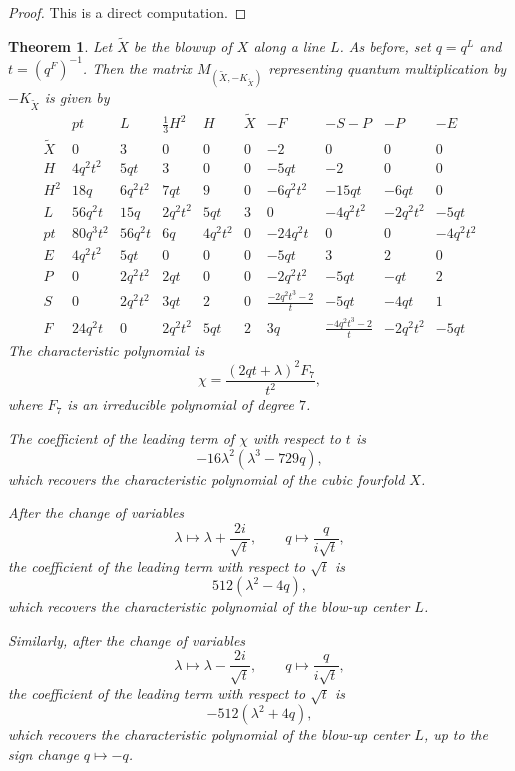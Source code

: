 \documentclass[11pt]{amsart}
\theoremstyle{plain}
\newtheorem{theorem}{Theorem}[section]
\numberwithin{equation}{section}
\theoremstyle{definition}
\theoremstyle{remark}
\begin{document}
\begin{proof}
This is a direct computation.
\end{proof}


\begin{theorem}\label{tMatrixCubicFourfoldLine}
Let $\widetilde{X}$ be the blowup of $X$ along a line $L$. As before, set $q = q^L$ and $t = (q^F)^{-1}$.
Then the matrix $M_{(\widetilde{X},-K_{\widetilde{X}})}$ representing quantum
multiplication by $-K_{\widetilde{X}}$ is given by
\[
\renewcommand{\arraystretch}{1.2}
\begin{array}{c|ccccc|cccc}
	& pt & L & \frac{1}{3}H^2 & H & \widetilde{X} & -F & -S-P & -P & -E \\
	\hline
       \widetilde{X} & 0&3&0&0&0&-2&0&0&0\\
       H & 4q^{2}t^{2}&5qt&3&0&0&-5qt&-2&0&0\\
       H^2 & 18q&6q^{2}t^{2}&7qt&9&0&-6q^{2}t^{2}&-15qt&-6qt&0\\
       L & 56q^{2}t&15q&2q^{2}t^{2}&5qt&3&0&-4q^{2}t^{2}&-2q^{2}t^{2}&-5qt\\
       pt & 80q^{3}t^{2}&56q^{2}t&6q&4q^{2}t^{2}&0&-24q^{2}t&0&0&-4q^{2}t^{2}\\
       \hline
       E & 4q^{2}t^{2}&5qt&0&0&0&-5qt&3&2&0\\
       P & 0&2q^{2}t^{2}&2qt&0&0&-2q^{2}t^{2}&-5qt&-qt&2\\
       S & 0&2q^{2}t^{2}&3qt&2&0&\frac{-2q^{2}t^{3}-2}{t}&-5qt&-4qt&1\\
       F & 24q^{2}t&0&2q^{2}t^{2}&5qt&2&3q&\frac{-4q^{2}t^{3}-2}{t}&-2q^{2}t^{2}&-5qt
 \end{array}
\]
The characteristic polynomial is
\[
    \chi =
    \frac{(2qt+\lambda)^2 F_7}{t^2},
\]
where $F_7$ is an irreducible polynomial of degree $7$. 

The coefficient of the leading term of $\chi$ with respect to $t$ is
\[
    -16\lambda^2(\lambda^3 - 729q),
\]
which recovers the characteristic polynomial of the cubic fourfold $X$.

After the change of variables
\[
    \lambda \mapsto \lambda + \frac{2i}{\sqrt{t}},
    \qquad
    q \mapsto \frac{q}{i\sqrt{t}},
\]
the coefficient of the leading term with respect to $\sqrt{t}$ is
\[
    512(\lambda^2 - 4q),
\]
which recovers the characteristic polynomial of the blow-up center $L$.

Similarly, after the change of variables
\[
    \lambda \mapsto \lambda - \frac{2i}{\sqrt{t}},
    \qquad
    q \mapsto \frac{q}{i\sqrt{t}},
\]
the coefficient of the leading term with respect to $\sqrt{t}$ is
\[
    -512(\lambda^2 + 4q),
\]
which recovers the characteristic polynomial of the blow-up center $L$, up to
the sign change $q \mapsto -q$.
\end{theorem}
\end{document}
